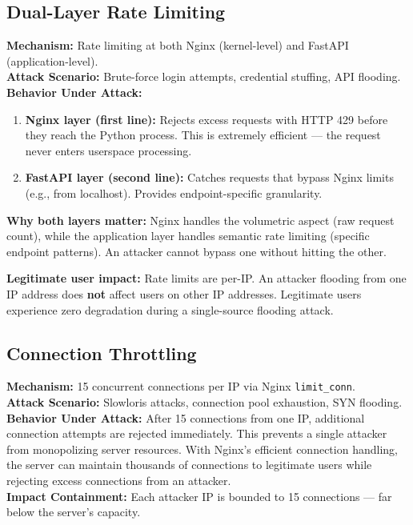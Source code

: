 \documentclass[11pt,a4paper]{article}
\begin{document}
\subsection{Dual-Layer Rate Limiting}

\begin{tcolorbox}[colback=toleranceamber!5, colframe=toleranceamber]
\textbf{Mechanism:} Rate limiting at both Nginx (kernel-level) and FastAPI (application-level).\\
\textbf{Attack Scenario:} Brute-force login attempts, credential stuffing, API flooding.\\
\textbf{Behavior Under Attack:}
\begin{enumerate}[nosep]
  \item \textbf{Nginx layer (first line):} Rejects excess requests with HTTP 429 before they reach the Python process. This is extremely efficient — the request never enters userspace processing.
  \item \textbf{FastAPI layer (second line):} Catches requests that bypass Nginx limits (e.g., from localhost). Provides endpoint-specific granularity.
\end{enumerate}
\textbf{Why both layers matter:} Nginx handles the volumetric aspect (raw request count), while the application layer handles semantic rate limiting (specific endpoint patterns). An attacker cannot bypass one without hitting the other.

\textbf{Legitimate user impact:} Rate limits are per-IP. An attacker flooding from one IP address does \textbf{not} affect users on other IP addresses. Legitimate users experience zero degradation during a single-source flooding attack.
\end{tcolorbox}

\subsection{Connection Throttling}

\begin{tcolorbox}[colback=toleranceamber!5, colframe=toleranceamber]
\textbf{Mechanism:} 15 concurrent connections per IP via Nginx \texttt{limit\_conn}.\\
\textbf{Attack Scenario:} Slowloris attacks, connection pool exhaustion, SYN flooding.\\
\textbf{Behavior Under Attack:} After 15 connections from one IP, additional connection attempts are rejected immediately. This prevents a single attacker from monopolizing server resources. With Nginx's efficient connection handling, the server can maintain thousands of connections to legitimate users while rejecting excess connections from an attacker.\\
\textbf{Impact Containment:} Each attacker IP is bounded to 15 connections — far below the server's capacity.
\end{tcolorbox}
\end{document}
